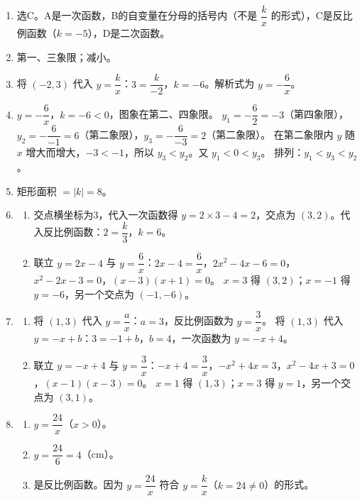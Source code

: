 \documentclass[12pt, a4paper]{ctexart}
\begin{document}
\vspace{10pt}
\begin{knowledgebox}[参考答案]
\begin{enumerate}[label=\textbf{\arabic*.}, leftmargin=2em]
  \item 选C。A是一次函数，B的自变量在分母的括号内（不是 $\dfrac{k}{x}$ 的形式），C是反比例函数（$k=-5$），D是二次函数。

  \item 第一、三象限；减小。

  \item 将 $(-2, 3)$ 代入 $y = \dfrac{k}{x}$：$3 = \dfrac{k}{-2}$，$k = -6$。解析式为 $y = -\dfrac{6}{x}$。

  \item $y = -\dfrac{6}{x}$，$k = -6 < 0$，图象在第二、四象限。
  $y_1 = -\dfrac{6}{2} = -3$（第四象限），$y_2 = -\dfrac{6}{-1} = 6$（第二象限），$y_3 = -\dfrac{6}{-3} = 2$（第二象限）。
  在第二象限内 $y$ 随 $x$ 增大而增大，$-3 < -1$，所以 $y_3 < y_2$。又 $y_1 < 0 < y_3$。
  排列：$y_1 < y_3 < y_2$。

  \item 矩形面积 $= |k| = 8$。

  \item
  \begin{enumerate}[label=(\arabic*)]
    \item 交点横坐标为3，代入一次函数得 $y = 2 \times 3 - 4 = 2$，交点为 $(3, 2)$。代入反比例函数：$2 = \dfrac{k}{3}$，$k = 6$。
    \item 联立 $y = 2x - 4$ 与 $y = \dfrac{6}{x}$：$2x - 4 = \dfrac{6}{x}$，$2x^2 - 4x - 6 = 0$，$x^2 - 2x - 3 = 0$，$(x-3)(x+1)=0$。
    $x = 3$ 得 $(3, 2)$；$x = -1$ 得 $y = -6$，另一个交点为 $(-1, -6)$。
  \end{enumerate}

  \item
  \begin{enumerate}[label=(\arabic*)]
    \item 将 $(1, 3)$ 代入 $y = \dfrac{a}{x}$：$a = 3$，反比例函数为 $y = \dfrac{3}{x}$。
    将 $(1, 3)$ 代入 $y = -x + b$：$3 = -1 + b$，$b = 4$，一次函数为 $y = -x + 4$。
    \item 联立 $y = -x + 4$ 与 $y = \dfrac{3}{x}$：$-x + 4 = \dfrac{3}{x}$，$-x^2 + 4x = 3$，$x^2 - 4x + 3 = 0$，$(x-1)(x-3)=0$。
    $x = 1$ 得 $(1, 3)$；$x = 3$ 得 $y = 1$，另一个交点为 $(3, 1)$。
  \end{enumerate}

  \item
  \begin{enumerate}[label=(\arabic*)]
    \item $y = \dfrac{24}{x}$（$x > 0$）。
    \item $y = \dfrac{24}{6} = 4$（cm）。
    \item 是反比例函数。因为 $y = \dfrac{24}{x}$ 符合 $y = \dfrac{k}{x}$（$k = 24 \neq 0$）的形式。
  \end{enumerate}


\end{enumerate}
\end{knowledgebox}
\end{document}
